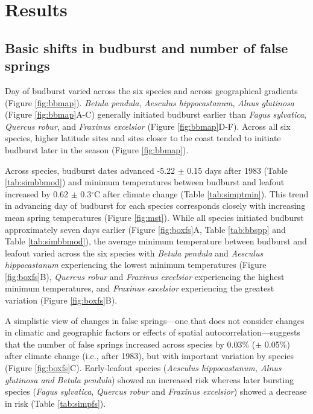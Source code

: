\documentclass{article}\usepackage[]{graphicx}\usepackage[]{color}
\begin{document}
\section*{Results}
\subsection*{Basic shifts in budburst and number of false springs}
Day of budburst varied across the six species and across geographical gradients (Figure \ref{fig:bbmap}). \textit{Betula pendula}, \textit{Aesculus hippocastanum}, \textit{Alnus glutinosa} (Figure \ref{fig:bbmap}A-C) generally initiated budburst earlier than \textit{Fagus sylvatica}, \textit{Quercus robur}, and \textit{Fraxinus excelsior} (Figure \ref{fig:bbmap}D-F). Across all six species, higher latitude sites and sites closer to the coast tended to initiate budburst later in the season (Figure \ref{fig:bbmap}).  

Across species, budburst dates advanced -5.22 $\pm$ 0.15 days after 1983 (Table \ref{tab:simbbmod}) and minimum temperatures between budburst and leafout increased by 0.62 $\pm$ 0.3$^{\circ}$C after climate change (Table \ref{tab:simptmin}). This trend in advancing day of budburst for each species corresponds closely with increasing mean spring temperatures (Figure \ref{fig:mst}). While all species initiated budburst approximately seven days earlier (Figure \ref{fig:boxfs}A, Table \ref{tab:bbspp} and Table \ref{tab:simbbmod}), the average minimum temperature between budburst and leafout varied across the six species with \textit{Betula pendula} and \textit{Aesculus hippocastanum} experiencing the lowest minimum temperatures (Figure \ref{fig:boxfs}B), \textit{Quercus robur} and \textit{Fraxinus excelsior} experiencing the highest minimum temperatures, and \textit{Fraxinus excelsior} experiencing the greatest variation (Figure \ref{fig:boxfs}B). 

A simplistic view of changes in false springs---one that does not consider changes in climatic and geographic factors or effects of spatial autocorrelation---suggests that the number of false springs increased across species by 0.03\% ($\pm$ 0.05\%) after climate change (i.e., after 1983), but with important variation by species (Figure \ref{fig:boxfs}C). Early-leafout species (\textit{Aesculus hippocastanum, \textit{Alnus glutinosa} and \textit{Betula pendula}}) showed an increased risk whereas later bursting species (\textit{Fagus sylvatica}, \textit{Quercus robur} and \textit{Fraxinus excelsior}) showed a decrease in risk (Table \ref{tab:simpfs}). 
\end{document}
